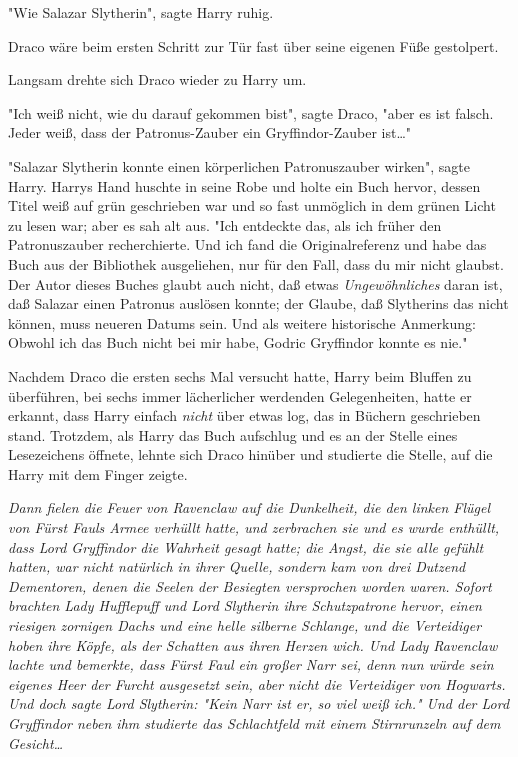 {"Wie Salazar Slytherin", sagte Harry ruhig.

Draco wäre beim ersten Schritt zur Tür fast über seine eigenen Füße gestolpert.

Langsam drehte sich Draco wieder zu Harry um.

"Ich weiß nicht, wie du darauf gekommen bist", sagte Draco, "aber es ist falsch. Jeder weiß, dass der Patronus-Zauber ein Gryffindor-Zauber ist…"

"Salazar Slytherin konnte einen körperlichen Patronuszauber wirken", sagte Harry. Harrys Hand huschte in seine Robe und holte ein Buch hervor, dessen Titel weiß auf grün geschrieben war und so fast unmöglich in dem grünen Licht zu lesen war; aber es sah alt aus. "Ich entdeckte das, als ich früher den Patronuszauber recherchierte. Und ich fand die Originalreferenz und habe das Buch aus der Bibliothek ausgeliehen, nur für den Fall, dass du mir nicht glaubst. Der Autor dieses Buches glaubt auch nicht, daß etwas \emph{Ungewöhnliches} daran ist, daß Salazar einen Patronus auslösen konnte; der Glaube, daß Slytherins das nicht können, muss neueren Datums sein. Und als weitere historische Anmerkung: Obwohl ich das Buch nicht bei mir habe, Godric Gryffindor konnte es nie."

Nachdem Draco die ersten sechs Mal versucht hatte, Harry beim Bluffen zu überführen, bei sechs immer lächerlicher werdenden Gelegenheiten, hatte er erkannt, dass Harry einfach \emph{nicht} über etwas log, das in Büchern geschrieben stand. Trotzdem, als Harry das Buch aufschlug und es an der Stelle eines Lesezeichens öffnete, lehnte sich Draco hinüber und studierte die Stelle, auf die Harry mit dem Finger zeigte.

\emph{Dann fielen die Feuer von Ravenclaw auf die Dunkelheit, die den linken Flügel von Fürst Fauls Armee verhüllt hatte, und zerbrachen sie und es wurde enthüllt, dass Lord Gryffindor die Wahrheit gesagt hatte; die Angst, die sie alle gefühlt hatten, war nicht natürlich in ihrer Quelle, sondern kam von drei Dutzend Dementoren, denen die Seelen der Besiegten versprochen worden waren. Sofort brachten Lady Hufflepuff und Lord Slytherin ihre Schutzpatrone hervor, einen riesigen zornigen Dachs und eine helle silberne Schlange, und die Verteidiger hoben ihre Köpfe, als der Schatten aus ihren Herzen wich. Und Lady Ravenclaw lachte und bemerkte, dass Fürst Faul ein großer Narr sei, denn nun würde sein eigenes Heer der Furcht ausgesetzt sein, aber nicht die Verteidiger von Hogwarts. Und doch sagte Lord Slytherin: "Kein Narr ist er, so viel weiß ich." Und der Lord Gryffindor neben ihm studierte das Schlachtfeld mit einem Stirnrunzeln auf dem Gesicht…}

}
